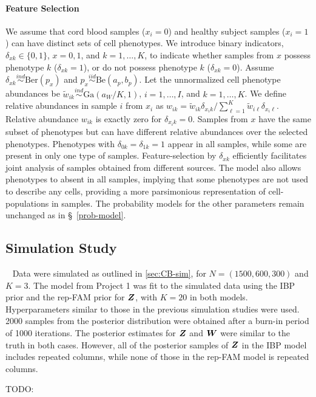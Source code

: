 \documentclass[12pt,]{article}
\newcommand{\iid}{\overset{iid}{\sim}}
\newcommand{\ind}{\overset{ind}{\sim}}
\def\G{\text{Ga}}
\def\Ber{\text{Ber}}
\def\Be{\text{Be}}
\newcommand{\bZ}{\mbox{\boldmath $Z$}}
\newcommand{\bW}{\mbox{\boldmath $W$}}
\begin{document}
\paragraph*{Feature Selection} We assume that cord blood samples ($x_i=0$) and
healthy subject samples ($x_i=1$) can have distinct sets of cell phenotypes.
We introduce binary indicators, $\delta_{xk}\in \{0, 1\}$, $x=0,1$, and
$k=1,\ldots, K$, to indicate whether samples from $x$ possess phenotype $k$
($\delta_{xk}=1$), or do not possess phenotype $k$ ($\delta_{xk}=0$). Assume
$\delta_{xk} \ind \Ber(p_{x})$ and $p_x \iid \Be(a_p, b_p)$.  Let the unnormalized
cell phenotype abundances be $\tilde w_{ik} \ind \G(a_W/K, 1)$, $i=1, \ldots, I$,
and $k=1, \ldots, K$. We define relative abundances in sample $i$ from
$x_i$ as 
$
w_{ik} =\tilde w_{ik} \delta_{x_i k}/\sum_{\ell=1}^K\tilde w_{i\ell} \delta_{x_i \ell}.
$
Relative abundance $w_{ik}$ is exactly zero for $\delta_{x_ik}=0$. Samples
from $x$ have the same subset of phenotypes but can have different relative
abundances over the selected phenotypes. Phenotypes with
$\delta_{0k}=\delta_{1k}=1$ appear in all samples, while some are present in only
one type of samples. Feature-selection by $\delta_{xk}$ efficiently facilitates
joint analysis of samples obtained from different sources. The model also
allows phenotypes to absent in all samples, implying that some phenotypes are not
used to describe any cells, providing a more parsimonious representation of 
cell-populations in samples. The probability models for the other parameters
remain unchanged as in \S~\ref{prob-model}.  



\subsection{Simulation Study}~\label{sec:rep-sim}
Data were simulated as outlined in \ref{sec:CB-sim}, for $N=(1500, 600, 300)$
and $K=3$. The model from Project 1 was fit to the simulated data using the IBP
prior and the rep-FAM prior for $\bZ$, with $K=20$ in both models.
Hyperparameters similar to those in the previous simulation studies were used.
2000 samples from the posterior distribution were obtained after a burn-in
period of 1000 iterations.  The posterior estimates for $\bZ$ and $\bW$ were
similar to the truth in both cases.  However, all of the posterior samples of
$\bZ$ in the IBP model includes repeated columns, while none of those in the
rep-FAM model is repeated columns. 

TODO:
\end{document}

